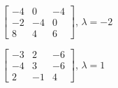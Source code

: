 \begin{exercise}
\begin{Parts}
\item \(\begin{bmatrix} -4 & 0 & -4
\\-2 & -4 & 0
\\8 & 4 & 6 \end{bmatrix}\), \(\lambda=-2\)

\item \(\begin{bmatrix} -3 & 2 & -6
\\-4 & 3 & -6
\\2 & -1 & 4 \end{bmatrix}\), \(\lambda=1\)

\end{Parts}
\end{exercise}







